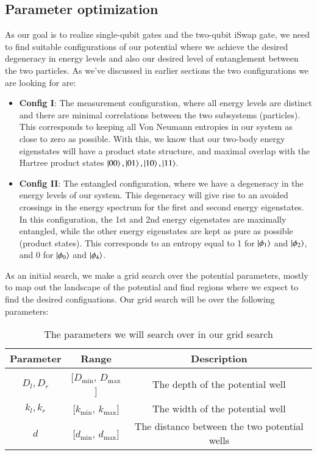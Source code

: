 \documentclass{subfiles}
\begin{document}
\subsection{Parameter optimization}\label{sec:optimization_procedure}
As our goal is to realize single-qubit gates and the two-qubit iSwap gate, we need to find suitable configurations of our potential where we achieve the desired degeneracy in energy levels and also our desired level of entanglement between the two particles. As we've discussed in earlier sections the two configurations we are looking for are:
\begin{itemize}
    \item \textbf{Config I}: The measurement configuration, where all energy levels are distinct and there are minimal correlations between the two subsystems (particles). This corresponds to keeping all Von Neumann entropies in our system as close to zero as possible. With this, we know that our two-body energy eigenstates will have a product state structure, and maximal overlap with the Hartree product states $\ket{00}, \ket{01}, \ket{10}, \ket{11}$.
    \item \textbf{Config II}: The entangled configuration, where we have a degeneracy in the energy levels of our system. This degeneracy will give rise to an avoided crossings in the energy spectrum for the first and second energy eigenstates. In this configuration, the 1st and 2nd energy eigenstates are maximally entangled, while the other energy eigenstates are kept as pure as possible (product states). This corresponds to an entropy equal to 1 for $\ket{\phi_1}$ and $\ket{\phi_2}$, and 0 for $\ket{\phi_0}$ and $\ket{\phi_4}$. 
\end{itemize}
As an initial search, we make a grid search over the potential parameters, mostly to map out the landscape of the potential and find regions where we expect to find the desired configuations. Our grid search will be over the following parameters:
\begin{table}
    \centering
    \begin{tabular}{|c|c|c|}
        \hline
        Parameter & Range & Description \\
        \hline
        $D_l, D_r$ & [$D_{\text{min}}$, $D_{\text{max}}$] & The depth of the potential well \\
        $k_l, k_r$ & [$k_{\text{min}}$, $k_{\text{max}}$] & The width of the potential well \\
        $d$ & [$d_{\text{min}}$, $d_{\text{max}}$] & The distance between the two potential wells \\
        \hline
    \end{tabular}
    \caption{The parameters we will search over in our grid search}
\end{table}
\end{document}
